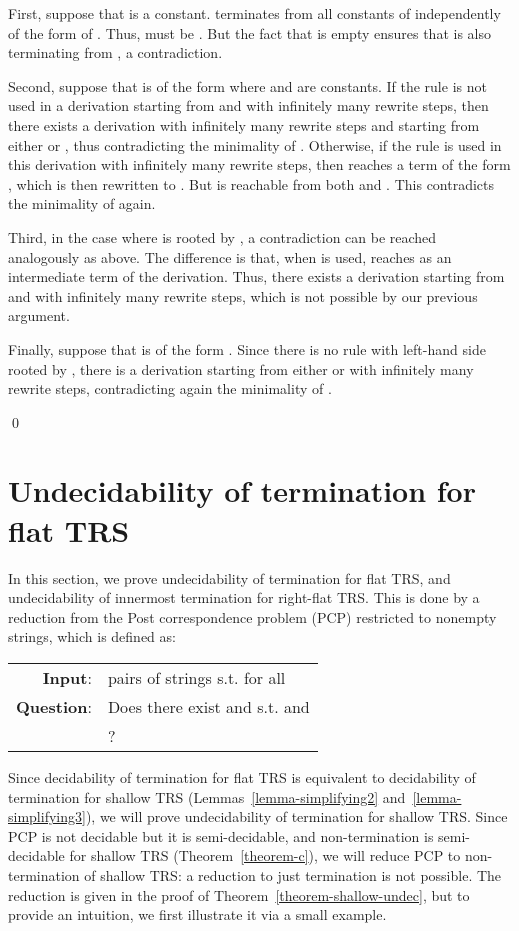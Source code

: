 \documentclass{LMCS}
\theoremstyle{plain}
\begin{document}
{\begin{enumerate}[]
First, suppose that  is a constant.  terminates from
all constants of  independently of
the form of . Thus,  must be .
But the fact that 
is empty ensures that  is also terminating from , a
contradiction.

Second, suppose that  is
of the form  where  and 
are constants. If the
rule  is not used
in a derivation starting from  and with infinitely many
rewrite steps, then there exists a
derivation with infinitely many rewrite steps
and starting from either  or , thus contradicting
the minimality of . Otherwise, if the rule  is used
in this derivation with infinitely many rewrite steps,
then  reaches a term of the form
, which is then rewritten to . But  is reachable
from both  and . This contradicts the minimality
of  again. 

Third, in the case where  is rooted by , a contradiction can
be reached analogously as above. The difference is that,
when  is used,  reaches  as an intermediate
term of the derivation. Thus, there exists a
derivation starting from  and with infinitely many rewrite steps,
which is not possible by our
previous argument.

Finally, suppose that  is of the form .
Since there is no rule with left-hand side rooted by ,
there is a derivation starting from either
 or  with infinitely many rewrite steps,
contradicting again the minimality of .
\end{enumerate}\qed
\endignore}

\section{Undecidability of termination for flat TRS}\label{sec-undec}

\noindent In this section, we prove undecidability of termination for 
flat TRS, and undecidability of innermost termination for 
right-flat TRS. This is done by
a reduction from the Post correspondence problem (PCP)
restricted to nonempty strings, which is defined as:\\
\begin{tabular}{rl}
{\bf Input}: &  pairs of strings 
  s.t. 
  for all 
\\
{\bf Question}:  &
Does there exist  and  s.t.
 and
\\ &
 ?
\end{tabular}


Since decidability of termination for flat TRS is equivalent to
decidability of termination for shallow TRS (Lemmas~\ref{lemma-simplifying2}
and~\ref{lemma-simplifying3}), we will prove 
undecidability of termination for shallow TRS.
Since PCP is not decidable but it is semi-decidable,
and non-termination is semi-decidable for shallow
TRS (Theorem~\ref{theorem-c}), we will
reduce PCP to non-termination of shallow TRS:
a reduction to just termination is not possible.
The reduction is given in the proof of 
Theorem~\ref{theorem-shallow-undec}, but
to provide an intuition, we first illustrate it via a small example.
\end{document}
